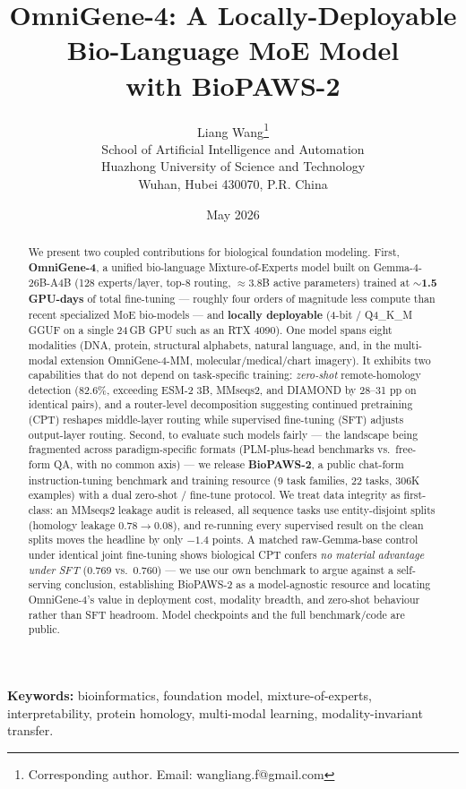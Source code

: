 \documentclass[11pt]{article}
\title{\textbf{OmniGene-4: A Locally-Deployable Bio-Language MoE Model\\ with BioPAWS-2}}
\author{Liang Wang\thanks{Corresponding author. Email: wangliang.f@gmail.com}\\
\small School of Artificial Intelligence and Automation\\
\small Huazhong University of Science and Technology\\
\small Wuhan, Hubei 430070, P.R. China}
\date{May 2026}
\begin{document}
\maketitle

\begin{abstract}
\noindent We present two coupled contributions for biological foundation modeling. First, \textbf{OmniGene-4}, a unified bio-language Mixture-of-Experts model built on Gemma-4-26B-A4B (128 experts/layer, top-8 routing, $\approx$3.8B active parameters) trained at \textbf{$\sim$1.5 GPU-days} of total fine-tuning --- roughly four orders of magnitude less compute than recent specialized MoE bio-models --- and \textbf{locally deployable} (4-bit / Q4\_K\_M GGUF on a single 24\,GB GPU such as an RTX 4090). One model spans eight modalities (DNA, protein, structural alphabets, natural language, and, in the multi-modal extension OmniGene-4-MM, molecular/medical/chart imagery). It exhibits two capabilities that do not depend on task-specific training: \emph{zero-shot} remote-homology detection (82.6\%, exceeding ESM-2 3B, MMseqs2, and DIAMOND by 28--31 pp on identical pairs), and a router-level decomposition suggesting continued pretraining (CPT) reshapes middle-layer routing while supervised fine-tuning (SFT) adjusts output-layer routing. Second, to evaluate such models fairly --- the landscape being fragmented across paradigm-specific formats (PLM-plus-head benchmarks vs.\ free-form QA, with no common axis) --- we release \textbf{BioPAWS-2}, a public chat-form instruction-tuning benchmark and training resource (9 task families, 22 tasks, 306K examples) with a dual zero-shot / fine-tune protocol. We treat data integrity as first-class: an MMseqs2 leakage audit is released, all sequence tasks use entity-disjoint splits (homology leakage 0.78$\to$0.08), and re-running every supervised result on the clean splits moves the headline by only $-1.4$ points. A matched raw-Gemma-base control under identical joint fine-tuning shows biological CPT confers \emph{no material advantage under SFT} (0.769 vs.\ 0.760) --- we use our own benchmark to argue against a self-serving conclusion, establishing BioPAWS-2 as a model-agnostic resource and locating OmniGene-4's value in deployment cost, modality breadth, and zero-shot behaviour rather than SFT headroom. Model checkpoints and the full benchmark/code are public.
\end{abstract}


\medskip
\noindent\textbf{Keywords:} bioinformatics, foundation model, mixture-of-experts, interpretability, protein homology, multi-modal learning, modality-invariant transfer.
\end{document}
